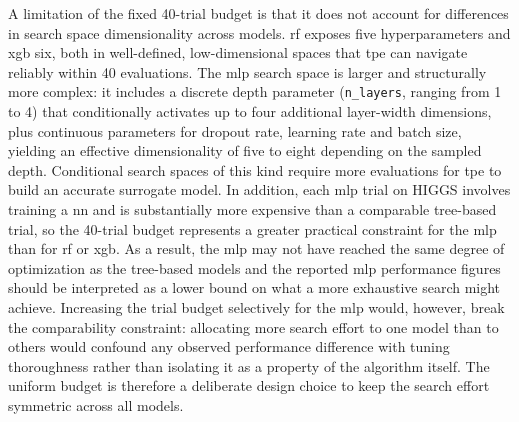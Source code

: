 A limitation of the fixed 40-trial budget is that it does not account for differences in search space dimensionality across models. \gls{rf} exposes five hyperparameters and \gls{xgb} six, both in well-defined, low-dimensional spaces that \gls{tpe} can navigate reliably within 40 evaluations. The \gls{mlp} search space is larger and structurally more complex: it includes a discrete depth parameter (\texttt{n\_layers}, ranging from 1 to 4) that conditionally activates up to four additional layer-width dimensions, plus continuous parameters for dropout rate, learning rate and batch size, yielding an effective dimensionality of five to eight depending on the sampled depth. Conditional search spaces of this kind require more evaluations for \gls{tpe} to build an accurate surrogate model. In addition, each \gls{mlp} trial on HIGGS involves training a \gls{nn} and is substantially more expensive than a comparable tree-based trial, so the 40-trial budget represents a greater practical constraint for the \gls{mlp} than for \gls{rf} or \gls{xgb}. As a result, the \gls{mlp} may not have reached the same degree of optimization as the tree-based models and the reported \gls{mlp} performance figures should be interpreted as a lower bound on what a more exhaustive search might achieve. Increasing the trial budget selectively for the \gls{mlp} would, however, break the comparability constraint: allocating more search effort to one model than to others would confound any observed performance difference with tuning thoroughness rather than isolating it as a property of the algorithm itself. The uniform budget is therefore a deliberate design choice to keep the search effort symmetric across all models.


